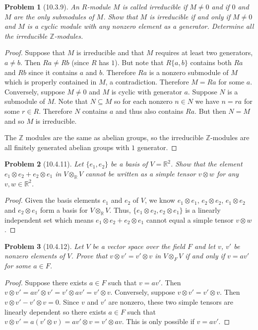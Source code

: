 \documentclass{article}
\newtheorem{problem}{Problem}
\begin{document}
\begin{problem}[10.3.9]
An $R$-module $M$ is called \emph{irreducible} if $M \neq 0$ and if $0$ and $M$ are the only submodules of $M$. Show that $M$ is irreducible if and only if $M \neq 0$ and $M$ is a cyclic module with any nonzero element as a generator. Determine all the irreducible $\mathbb{Z}$-modules.
\end{problem}
\begin{proof}
Suppose that $M$ is irreducible and that $M$ requires at least two generators, $a \neq b$. Then $Ra \neq Rb$ (since $R$ has $1$). But note that $R\{a,b\}$ contains both $Ra$ and $Rb$ since it contains $a$ and $b$. Therefore $Ra$ is a nonzero submodule of $M$ which is properly contained in $M$, a contradiction. Therefore $M = Ra$ for some $a$. Conversely, suppose $M \neq 0$ and $M$ is cyclic with generator $a$. Suppose $N$ is a submodule of $M$. Note that $N \subseteq M$ so for each nonzero $n \in N$ we have $n = ra$ for some $r \in R$. Therefore $N$ contains $a$ and thus also contains $Ra$. But then $N = M$ and so $M$ is irreducible.

The $\mathbb{Z}$ modules are the same as abelian groups, so the irreducible $\mathbb{Z}$-modules are all finitely generated abelian groups with $1$ generator.
\end{proof}

\begin{problem}[10.4.11]
Let $\{e_1, e_2\}$ be a basis of $V = \mathbb{R}^2$. Show that the element $e_1 \otimes e_2 + e_2 \otimes e_1$ in $V \otimes_{\mathbb{R}} V$ cannot be written as a simple tensor $v \otimes w$ for any $v,w \in \mathbb{R}^2$.
\end{problem}
\begin{proof}
Given the basis elements $e_1$ and $e_2$ of $V$, we know $e_1 \otimes e_1$, $e_2 \otimes e_2$, $e_1 \otimes e_2$ and $e_2 \otimes e_1$ form a basis for $V \otimes_{\mathbb{R}} V$. Thus, $\{e_1 \otimes e_2, e_2 \otimes e_1\}$ is a linearly independent set which means $e_1 \otimes e_2 + e_2 \otimes e_1$ cannot equal a simple tensor $v \otimes w$.
\end{proof}

\begin{problem}[10.4.12]
Let $V$ be a vector space over the field $F$ and let $v$, $v'$ be nonzero elements of $V$. Prove that $v \otimes v' = v' \otimes v$ in $V \otimes_F V$ if and only if $v = av'$ for some $a \in F$.
\end{problem}
\begin{proof}
Suppose there exists $a \in F$ such that $v = av'$. Then $v \otimes v' = av' \otimes v' = v' \otimes av' = v' \otimes v$. Conversely, suppose $v \otimes v' = v' \otimes v$. Then $v \otimes v' - v' \otimes v = 0$. Since $v$ and $v'$ are nonzero, these two simple tensors are linearly dependent so there exists $a \in F$ such that $v \otimes v' = a(v' \otimes v) = av' \otimes v = v' \otimes av$. This is only possible if $v = av'$.
\end{proof}
\end{document}
